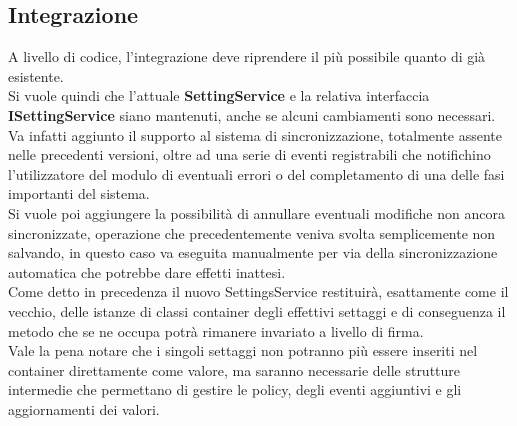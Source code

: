\documentclass[\main/tesi.tex]{subfiles}
\begin{document}
\subsection{Integrazione}
A livello di codice, l'integrazione deve riprendere il più possibile quanto di già esistente.\\
Si vuole quindi che l'attuale \textbf{SettingService} e la relativa interfaccia \textbf{ISettingService} siano mantenuti, anche se alcuni cambiamenti sono necessari.\\
Va infatti aggiunto il supporto al sistema di sincronizzazione, totalmente assente nelle precedenti versioni, oltre ad una serie di eventi registrabili che notifichino l'utilizzatore del modulo di eventuali errori o del completamento di una delle fasi importanti del sistema.\\
Si vuole poi aggiungere la possibilità di annullare eventuali modifiche non ancora sincronizzate, operazione che precedentemente veniva svolta semplicemente non salvando, in questo caso va eseguita manualmente per via della sincronizzazione automatica che potrebbe dare effetti inattesi.\\
Come detto in precedenza il nuovo SettingsService restituirà, esattamente come il vecchio, delle istanze di classi container degli effettivi settaggi e di conseguenza il metodo che se ne occupa potrà rimanere invariato a livello di firma.\\
Vale la pena notare che i singoli settaggi non potranno più essere inseriti nel container direttamente come valore, ma saranno necessarie delle strutture intermedie che permettano di gestire le policy, degli eventi aggiuntivi e gli aggiornamenti dei valori.
\end{document}

